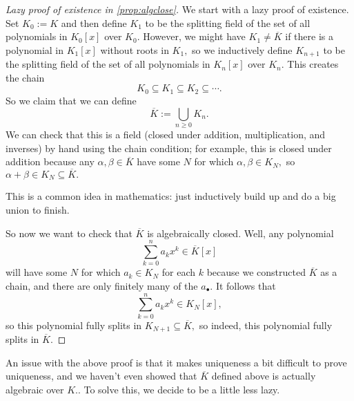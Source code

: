 \documentclass[../notes.tex]{subfiles}
\begin{document}
\begin{proof}[Lazy proof of existence in \autoref{prop:algclose}]
	We start with a lazy proof of existence. Set $K_0:=K$ and then define $K_1$ to be the splitting field of the set of all polynomials in $K_0[x]$ over $K_0.$ However, we might have $K_1\ne\overline K$ if there is a polynomial in $K_1[x]$ without roots in $K_1,$ so we inductively define $K_{n+1}$ to be the splitting field of the set of all polynomials in $K_n[x]$ over $K_n.$ This creates the chain
	\[K_0\subseteq K_1\subseteq K_2\subseteq\cdots.\]
	So we claim that we can define
	\[\overline K:=\bigcup_{n\ge0}K_n.\]
	We can check that this is a field (closed under addition, multiplication, and inverses) by hand using the chain condition; for example, this is closed under addition because any $\alpha,\beta\in\overline K$ have some $N$ for which $\alpha,\beta\in K_N,$ so $\alpha+\beta\in K_N\subseteq\overline K.$
	\begin{remark}
		This is a common idea in mathematics: just inductively build up and do a big union to finish.
	\end{remark}
	So now we want to check that $\overline K$ is algebraically closed. Well, any polynomial
	\[\sum_{k=0}^na_kx^k\in\overline K[x]\]
	will have some $N$ for which $a_k\in K_N$ for each $k$ because we constructed $\overline K$ as a chain, and there are only finitely many of the $a_\bullet.$ It follows that
	\[\sum_{k=0}^na_kx^k\in K_N[x],\]
	so this polynomial fully splits in $K_{N+1}\subseteq\overline K,$ so indeed, this polynomial fully splits in $\overline K.$
\end{proof}
An issue with the above proof is that it makes uniqueness a bit difficult to prove uniqueness, and we haven't even showed that $\overline K$ defined above is actually algebraic over $K.$. To solve this, we decide to be a little less lazy.
\end{document}
